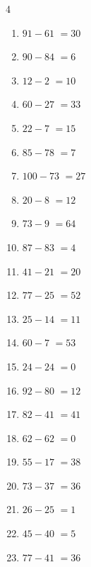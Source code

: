 \begin{multicols}{4}
\begin{enumerate}
  \item $91-61$
        $=30$

  \item $90-84$
        $=6$

  \item $12-2$
        $=10$

  \item $60-27$
        $=33$

  \item $22-7$
        $=15$

  \item $85-78$
        $=7$

  \item $100-73$
        $=27$

  \item $20-8$
        $=12$

  \item $73-9$
        $=64$

  \item $87-83$
        $=4$

  \item $41-21$
        $=20$

  \item $77-25$
        $=52$

  \item $25-14$
        $=11$

  \item $60-7$
        $=53$

  \item $24-24$
        $=0$

  \item $92-80$
        $=12$

\columnbreak %

  \item $82-41$
        $=41$

  \item $62-62$
        $=0$

  \item $55-17$
        $=38$

  \item $73-37$
        $=36$

  \item $26-25$
        $=1$

  \item $45-40$
        $=5$

  \item $77-41$
        $=36$


\end{enumerate}
\end{multicols}
